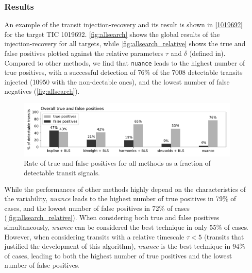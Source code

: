 \documentclass{aastex631}
\newcommand{\nuancemethod}{\textit{nuance}}
\newcommand{\nuance}{\nuancemethod{}}
\begin{document}
\newpage
\subsubsection*{Results}
An example of the transit injection-recovery and its result is shown in \autoref{1019692} for the target TIC 1019692. \autoref{fig:allsearch} shows the global results of the injection-recovery for all targets, while \autoref{fig:allsearch_relative} shows the true and false positives plotted against the relative parameters $\tau$ and $\delta$ (defined in). Compared to other methods, we find that \texttt{nuance} leads to the highest number of true positives, with a successful detection of 76\% of the 7008 detectable transits injected (10950 with the non-dectable ones), and the lowest number of false negatives (\autoref{fig:allsearch}).
\begin{figure}[H]
    \begin{centering}
        \includegraphics[width=0.9\linewidth]{../workflows/tess_injection_recovery/figures/true_and_false_positives_bars.pdf}
        \caption{Rate of true and false positives for all methods as a fraction of detectable transit signals.}
        \label{fig:allsearch}
    \end{centering}
\end{figure}
While the performances of other methods highly depend on the characteristics of the variability, \nuance{} leads to the highest number of true positives in 79\% of cases, and the lowest number of false positives in 72\% of cases (\autoref{fig:allsearch_relative}). When considering both true and false positives simultaneously, \nuance{} can be considered the best technique in only 55\% of cases. However, when considering transits with a relative timescale $\tau < 5$ (transits that justified the development of this algorithm), \nuance{} is the best technique in 94\% of cases, leading to both the highest number of true positives and the lowest number of false positives.
\end{document}
